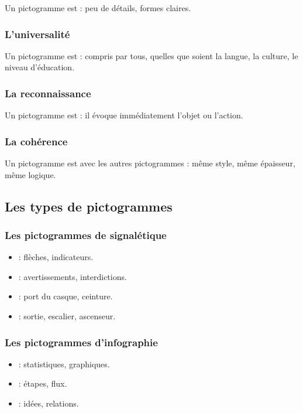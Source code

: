 Un pictogramme est  : peu de détails, formes claires.

\subsubsection{L'universalité}

Un pictogramme est  : compris par tous, quelles que soient la langue, la culture, le niveau d'éducation.

\subsubsection{La reconnaissance}

Un pictogramme est  : il évoque immédiatement l'objet ou l'action.

\subsubsection{La cohérence}

Un pictogramme est  avec les autres pictogrammes : même style, même épaisseur, même logique.

\subsection{Les types de pictogrammes}

\subsubsection{Les pictogrammes de signalétique}

\begin{itemize}
    \item {} : flèches, indicateurs.
    \item {} : avertissements, interdictions.
    \item {} : port du casque, ceinture.
    \item {} : sortie, escalier, ascenseur.
\end{itemize}

\subsubsection{Les pictogrammes d'infographie}

\begin{itemize}
    \item {} : statistiques, graphiques.
    \item {} : étapes, flux.
    \item {} : idées, relations.
\end{itemize}

